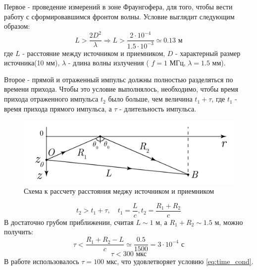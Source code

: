 Первое - проведение измерений в зоне Фраунгофера, для того, чтобы вести работу с сформировавшимся фронтом волны. Условие
выглядит следующим образом:
\begin{equation}
	L > \frac{2D^2}{\lambda} \Rightarrow L > \frac{2 \cdot 10^{-4}}{1.5 \cdot 10^{-3}} \simeq 0.13 \text{ м} 
	\label{eq:exp:fraungofer}
\end{equation}
где $L$ - расстояние между источником и приемником, $D$ - характерный размер источника(10 мм), $\lambda$ - длина волны
излучения ( $f = 1$ МГц, $\lambda = 1.5$ мм). 

Второе - прямой и отраженный импульс должны полностью разделяться по времени прихода. Чтобы это условие выполнялось,
необходимо, чтобы время прихода отраженного импульса $t_2$ было больше, чем величина $t_1+\tau$, где $t_1$ - время
прихода прямого импульса, а $\tau$ - длительность импульса.
\begin{figure}[h!]
	\centering
	\includegraphics[width =0.7\linewidth]{fig/scheme2.pdf}
	\caption{Схема к рассчету расстояния меджу источником и приемником}
	\label{fig:expt:scheme2}
\end{figure}

\begin{equation}
	t_2 > t_1 + \tau, \quad t_1 = \frac{L}{c}, t_2 = \frac{R_1+R_2}{c}
\end{equation}
В достаточно грубом приближении, считая $L \sim 1$ м, а $R_1+R_2 \sim 1.5$ м, можно получить:
\begin{equation}
	\tau < \frac{R_1+R_2-L}{c} \simeq \frac{0.5}{1500} = 3 \cdot 10^{-4} \text{ с}
\end{equation}
\begin{equation}
	\tau < 300 \text{ мкс}
	\label{eq:time_cond}
\end{equation}
В работе использовалось $\tau = 100$ мкс, что удовлетворяет условию \eqref{eq:time_cond}.

